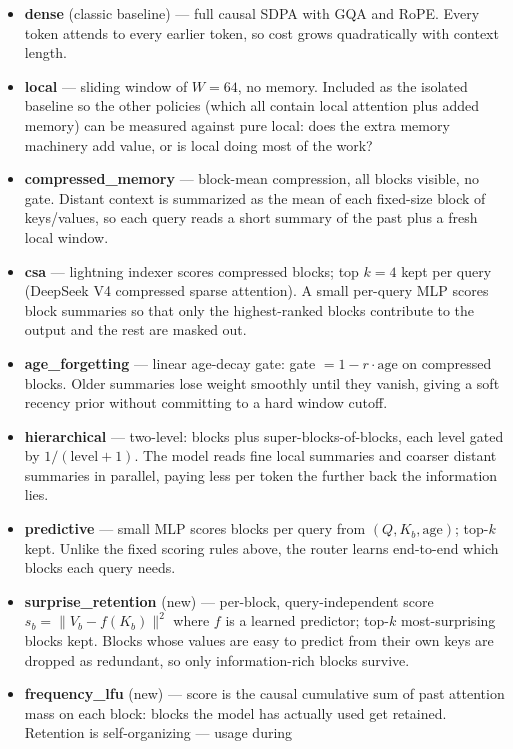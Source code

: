 \documentclass[10pt]{article}
\begin{document}
\begin{itemize}
\item \textbf{dense} (classic baseline) --- full causal SDPA with GQA
and RoPE. Every token attends to every earlier token, so cost grows
quadratically with context length.
\item \textbf{local} --- sliding window of $W=64$, no memory. Included as
the isolated baseline so the other policies (which all contain local
attention plus added memory) can be measured against pure local: does
the extra memory machinery add value, or is local doing most of the work?
\item \textbf{compressed\_memory} --- block-mean compression, all blocks
visible, no gate. Distant context is summarized as the mean of each
fixed-size block of keys/values, so each query reads a short summary of
the past plus a fresh local window.
\item \textbf{csa} --- lightning indexer scores compressed blocks; top
$k=4$ kept per query (DeepSeek V4 compressed sparse attention). A small
per-query MLP scores block summaries so that only the highest-ranked
blocks contribute to the output and the rest are masked out.
\item \textbf{age\_forgetting} --- linear age-decay gate: gate $=1-r\cdot
\text{age}$ on compressed blocks. Older summaries lose weight smoothly
until they vanish, giving a soft recency prior without committing to a
hard window cutoff.
\item \textbf{hierarchical} --- two-level: blocks plus
super-blocks-of-blocks, each level gated by $1/(\text{level}+1)$. The
model reads fine local summaries and coarser distant summaries in
parallel, paying less per token the further back the information lies.
\item \textbf{predictive} --- small MLP scores blocks per query from
$(Q, K_b, \text{age})$; top-$k$ kept. Unlike the fixed scoring rules
above, the router learns end-to-end which blocks each query needs.
\item \textbf{surprise\_retention} (new) --- per-block, query-independent
score $s_b = \|V_b - f(K_b)\|^2$ where $f$ is a learned predictor;
top-$k$ most-surprising blocks kept. Blocks whose values are easy to
predict from their own keys are dropped as redundant, so only
information-rich blocks survive.
\item \textbf{frequency\_lfu} (new) --- score is the causal cumulative
sum of past attention mass on each block: blocks the model has actually
used get retained. Retention is self-organizing --- usage during

\end{itemize}
\end{document}
